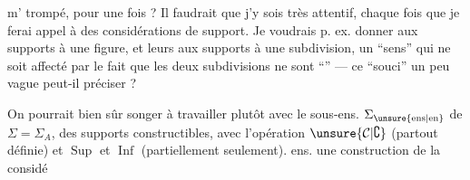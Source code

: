 m' trompé, pour une fois ? Il faudrait que j'y sois très attentif, chaque fois que je ferai appel à des considérations de support. Je voudrais p. ex. donner aux supports  à une figure, et leurs  aux supports  à une subdivision, un ``sens'' qui ne soit affecté par le fait que les deux subdivisions ne sont ``''  --- ce ``souci'' un peu vague peut-il  préciser ?

On pourrait bien sûr songer à travailler plutôt avec le sous-ens. $\Sigma_{\unsure{\mathrm{ens}|\mathrm{en}}}$ de $\Sigma=\Sigma_A$,  des supports  constructibles, avec l'opération $\unsure{\mathcal{C}|\complement}$ (partout définie) et $\operatorname{Sup}$ et $\operatorname{Inf}$ (partiellement  seulement).  ens.  une construction  de la considé%
